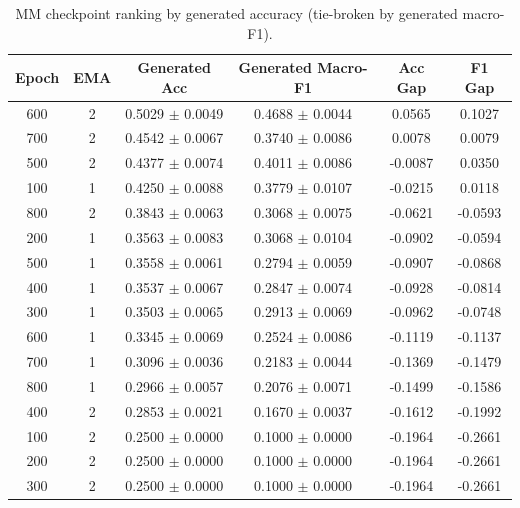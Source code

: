 \begin{table}[t]
\centering
\caption{MM checkpoint ranking by generated accuracy (tie-broken by generated macro-F1).}
\begin{tabular}{cccccc}
\toprule
Epoch & EMA & Generated Acc & Generated Macro-F1 & Acc Gap & F1 Gap \\
\midrule
600 & 2 & 0.5029 $\pm$ 0.0049 & 0.4688 $\pm$ 0.0044 & 0.0565 & 0.1027 \\
700 & 2 & 0.4542 $\pm$ 0.0067 & 0.3740 $\pm$ 0.0086 & 0.0078 & 0.0079 \\
500 & 2 & 0.4377 $\pm$ 0.0074 & 0.4011 $\pm$ 0.0086 & -0.0087 & 0.0350 \\
100 & 1 & 0.4250 $\pm$ 0.0088 & 0.3779 $\pm$ 0.0107 & -0.0215 & 0.0118 \\
800 & 2 & 0.3843 $\pm$ 0.0063 & 0.3068 $\pm$ 0.0075 & -0.0621 & -0.0593 \\
200 & 1 & 0.3563 $\pm$ 0.0083 & 0.3068 $\pm$ 0.0104 & -0.0902 & -0.0594 \\
500 & 1 & 0.3558 $\pm$ 0.0061 & 0.2794 $\pm$ 0.0059 & -0.0907 & -0.0868 \\
400 & 1 & 0.3537 $\pm$ 0.0067 & 0.2847 $\pm$ 0.0074 & -0.0928 & -0.0814 \\
300 & 1 & 0.3503 $\pm$ 0.0065 & 0.2913 $\pm$ 0.0069 & -0.0962 & -0.0748 \\
600 & 1 & 0.3345 $\pm$ 0.0069 & 0.2524 $\pm$ 0.0086 & -0.1119 & -0.1137 \\
700 & 1 & 0.3096 $\pm$ 0.0036 & 0.2183 $\pm$ 0.0044 & -0.1369 & -0.1479 \\
800 & 1 & 0.2966 $\pm$ 0.0057 & 0.2076 $\pm$ 0.0071 & -0.1499 & -0.1586 \\
400 & 2 & 0.2853 $\pm$ 0.0021 & 0.1670 $\pm$ 0.0037 & -0.1612 & -0.1992 \\
100 & 2 & 0.2500 $\pm$ 0.0000 & 0.1000 $\pm$ 0.0000 & -0.1964 & -0.2661 \\
200 & 2 & 0.2500 $\pm$ 0.0000 & 0.1000 $\pm$ 0.0000 & -0.1964 & -0.2661 \\
300 & 2 & 0.2500 $\pm$ 0.0000 & 0.1000 $\pm$ 0.0000 & -0.1964 & -0.2661 \\
\bottomrule
\end{tabular}
\label{tab:mm_ckpt_ranking}
\end{table}
